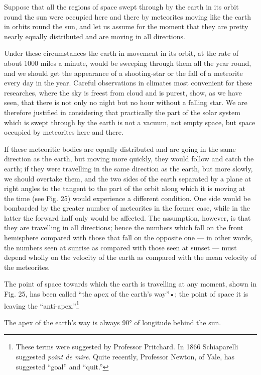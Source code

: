 \documentclass[a4paper, 12pt, oneside, polutonikogreek, english]{article}
\begin{document}
Suppose that all the regions of space swept through by the earth in its orbit round the sun were occupied here and there by meteorites moving like the earth in orbits round the sun, and let us assume for the moment that they are pretty nearly equally distributed and are moving in all directions.

Under these circumstances the earth in movement in its orbit, at the rate of about 1000 miles a minute, would be sweeping through them all the year round, and we should get the appearance of a shooting-star or the fall of a meteorite every day in the year. Careful observations in climates most convenient for these researches, where the sky is freest from cloud and is purest, show, as we have seen, that there is not only no night but no hour without a falling star. We are therefore justified in considering that practically the part of the solar system which is swept through by the earth is not a vacuum, not empty space, but space occupied by meteorites here and there.

If these meteoritic bodies are equally distributed and are going in the same direction as the earth, but moving more quickly, they would follow and catch the earth; if they were travelling in the same direction as the earth, but more slowly, we should overtake them, and the two sides of the earth separated by a plane at right angles to the tangent to the part of the orbit along which it is moving at the time (see Fig. 25) would experience a different condition. One side would be bombarded by the greater number of meteorites in the former case, while in the latter the forward half only would be affected. The assumption, however, is that they are travelling in all directions; hence the numbers which fall on the front hemisphere compared with those that fall on the opposite one --- in other words, the numbers seen at sunrise as compared with those seen at sunset --- must depend wholly on the velocity of the earth as compared with the mean velocity of the meteorites.

The point of space towards which the earth is travelling at any moment, shown in Fig. 25, has been called ``the apex of the earth's way''•; the point of space it is leaving the ``anti-apex.''\footnote{These terms were suggested by Professor Pritchard. In 1866 Schiaparelli suggested \emph{point de mire}. Quite recently, Professor Newton, of Yale, has suggested ``goal'' and ``quit.''}

The apex of the earth's way is always 90° of longitude behind the sun.
\end{document}
